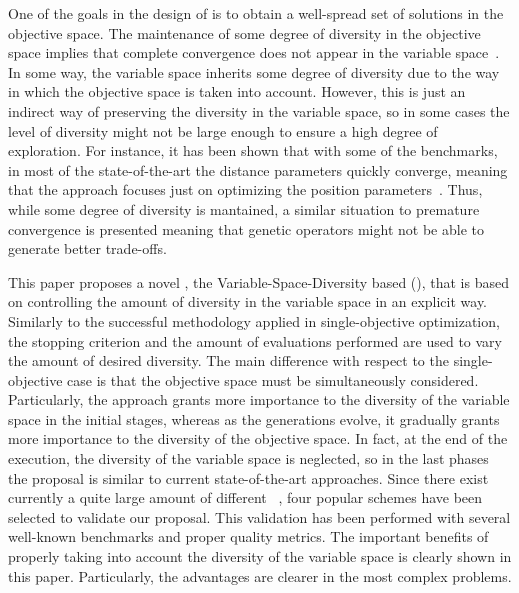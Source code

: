 One of the goals in the design of \MOEAS{} is to obtain a well-spread set of solutions in the objective space.
%
The maintenance of some degree of diversity in the objective space implies that complete convergence 
does not appear in the variable space~\cite{Joel:GDE3_CEC09}.
%
In some way, the variable space inherits some degree of diversity due to the way in which the objective space is taken into account. 
%
However, this is just an indirect way of preserving the diversity in the variable space, so in some cases the level of diversity might not be large enough to ensure
a high degree of exploration.
%
For instance, it has been shown that with some of the \WFG{} benchmarks, in most of the state-of-the-art \MOEAS{} the distance parameters quickly converge, meaning that the approach
focuses just on optimizing the position parameters~\cite{Joel:GDE3_CEC09}.
%
Thus, while some degree of diversity is mantained, a similar situation to premature convergence is presented
meaning that genetic operators might not be able to generate better trade-offs. 
%

This paper proposes a novel \MOEA{}, the Variable-Space-Diversity based \MOEA{} (\VSDMOEA{}), that is based on controlling the amount of diversity in the variable space in an explicit way.
%
Similarly to the successful methodology applied in single-objective optimization, the stopping criterion and the amount of evaluations performed are used
to vary the amount of desired diversity.
%
The main difference with respect to the single-objective case is that the objective space must be simultaneously considered.
%
Particularly, the approach grants more importance to the diversity of the variable space in the initial stages, whereas 
as the generations evolve, it gradually grants more importance to the diversity of the objective space.
%
In fact, at the end of the execution, the diversity of the variable space is neglected, so in the last phases the proposal is similar to current state-of-the-art approaches.
%
Since there exist currently a quite large amount of different \MOEAS{}~\cite{Joel:MOEA_APPLICATIONS_BOOK_KCTAN}, four popular schemes have been selected to
validate our proposal.
%
%
%
%
%
This validation has been performed with several well-known benchmarks and proper quality metrics.
%
The important benefits of properly taking into account the diversity of the variable space is
clearly shown in this paper.
%
Particularly, the advantages are clearer in the most complex problems.


